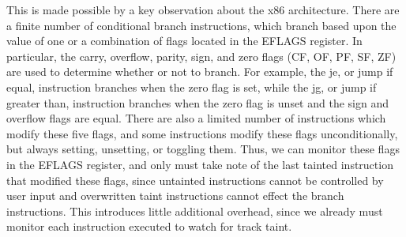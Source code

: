 \documentclass[11pt,expanded,copyright]{fsuthesis}
\begin{document}
This is made possible by a key observation about the x86 architecture. There are a finite number of conditional branch instructions, which branch based upon the value of one or a combination of flags located in the EFLAGS register. In particular, the carry, overflow, parity, sign, and zero flags (CF, OF, PF, SF, ZF) are used to determine whether or not to branch. For example, the je, or jump if equal, instruction branches when the zero flag is set, while the jg, or jump if greater than, instruction branches when the zero flag is unset and the sign and overflow flags are equal. There are also a limited number of instructions which modify these five flags, and some instructions modify these flags unconditionally, but always setting, unsetting, or toggling them. Thus, we can monitor these flags in the EFLAGS register, and only must take note of the last tainted instruction that modified these flags, since untainted instructions cannot be controlled by user input and overwritten taint instructions cannot effect the branch instructions. This introduces little additional overhead, since we already must monitor each instruction executed to watch for track taint.



\end{document}

